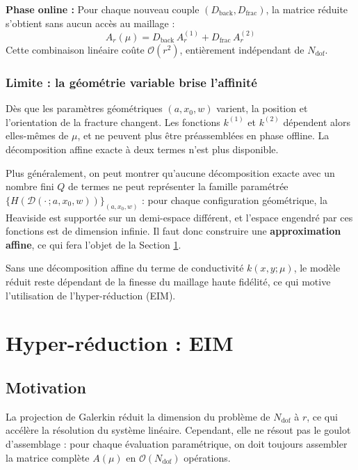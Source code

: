 \documentclass[12pt,a4paper]{article}
\begin{document}
\textbf{Phase online :} Pour chaque nouveau couple $(D_{\text{back}}, D_{\text{frac}})$, la matrice réduite s'obtient sans aucun accès au maillage :
\begin{equation*}
    A_r(\mu) = D_{\text{back}}\, A_r^{(1)} + D_{\text{frac}}\, A_r^{(2)}
\end{equation*}
Cette combinaison linéaire coûte $\mathcal{O}(r^2)$, entièrement indépendant de $N_{\text{dof}}$.
 
\subsubsection{Limite : la géométrie variable brise l'affinité}
 
Dès que les paramètres géométriques $(a, x_0, w)$ varient, la position et l'orientation de la fracture changent. Les fonctions $k^{(1)}$ et $k^{(2)}$ dépendent alors elles-mêmes de $\mu$, et ne peuvent plus être préassemblées en phase offline. La décomposition affine exacte à deux termes n'est plus disponible.
 
Plus généralement, on peut montrer qu'aucune décomposition exacte avec un nombre fini $Q$ de termes ne peut représenter la famille paramétrée $\{H(\mathcal{D}(\cdot\,; a, x_0, w))\}_{(a,x_0,w)}$ : pour chaque configuration géométrique, la Heaviside est supportée sur un demi-espace différent, et l'espace engendré par ces fonctions est de dimension infinie. Il faut donc construire une \textbf{approximation affine}, ce qui fera l'objet de la Section \ref{sec:eim}.

Sans une décomposition affine du terme de conductivité $k(x, y; \mu)$, le modèle réduit reste dépendant de la finesse du maillage haute fidélité, ce qui motive l'utilisation de l'hyper-réduction (EIM).



\section{Hyper-réduction : EIM} \label{sec:eim}

\subsection{Motivation}

La projection de Galerkin réduit la dimension du problème de $N_{\text{dof}}$ à $r$, ce qui accélère la résolution du système linéaire. Cependant, elle ne résout pas le goulot d'assemblage : pour chaque évaluation paramétrique, on doit toujours assembler la matrice complète $A(\mu)$ en $\mathcal{O}(N_{\text{dof}})$ opérations.
\end{document}
